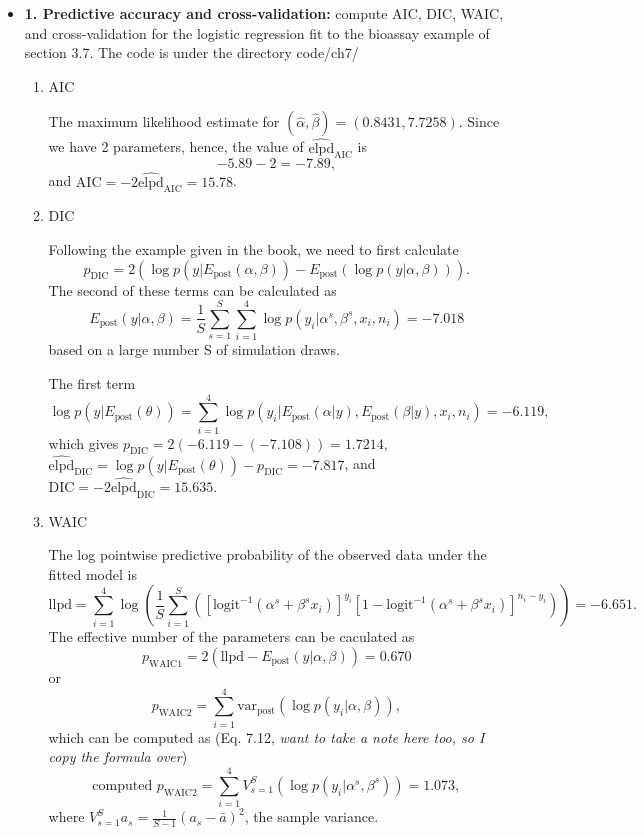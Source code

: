 \documentclass{article}
\begin{document}
\begin{itemize}

\item \textbf{1. Predictive accuracy and cross-validation: } compute AIC, DIC, WAIC, and cross-validation for the logistic regression fit to the bioassay example of section 3.7. The code is under the directory code/ch7/
  \begin{enumerate}
    \item AIC

      The maximum likelihood estimate for $(\hat{\alpha}, \hat{\beta}) = (0.8431, 7.7258)$. Since we have 2 parameters, hence, the value of $\hat{\text{elpd}}_{\text{AIC}}$ is
      $$
      -5.89 - 2 = -7.89,
      $$
      and $\text{AIC}=-2\hat{\text{elpd}}_{\text{AIC}} = 15.78$.
    
    \item DIC

      Following the example given in the book, we need to first calculate 
      $$p_{\text{DIC}} = 2 ( \log p(y|E_{\text{post}}(\alpha, \beta)) - E_{\text{post}} (\log p(y | \alpha, \beta))). $$
      The second of these terms can be calculated as
      $$
      E_{\text{post}}(y | \alpha, \beta) = \frac{1}{S} \sum_{s=1}^S \sum_{i=1}^4 \log p(y_i | \alpha^s, \beta^s, x_i, n_i) = -7.018
      $$
      based on a large number S of simulation draws. 
      
      The first term 
      $$
      \log p\left(y | E_{\text{post}} (\theta) \right) = \sum_{i=1}^4 \log p(y_i | E_{\text{post}}(\alpha|y), E_{\text{post}}(\beta | y), x_i, n_i) = -6.119,
      $$
      which gives $p_{\text{DIC}} = 2 (-6.119 - (-7.108)) = 1.7214$, $\hat{\text{elpd}}_{\text{DIC}} = \log p\left(y | E_{\text{post}} (\theta) \right) - p_{\text{DIC}} = -7.817$, and $\text{DIC} = -2 \hat{\text{elpd}}_{\text{DIC}} = 15.635$.

    \item WAIC

      The log pointwise predictive probability of the observed data under the fitted model is
      $$
      \text{llpd} = \sum_{i=1}^4 \log \left (\frac{1}{S} \sum_{i=1}^S \left([\text{logit}^{-1}(\alpha^s + \beta^s x_i)]^{y_i} [1 - \text{logit}^{-1}(\alpha^s + \beta^s x_i)]^{n_i - y_i} \right)\right) = -6.651.
      $$
      The effective number of the parameters can be caculated as 
      $$
      p_{\text{WAIC}1} = 2 (\text{llpd} - E_{\text{post}}(y | \alpha, \beta)) = 0.670
      $$
      or 
      $$
      p_{\text{WAIC}2} = \sum_{i=1}^4 \text{var}_{\text{post}} (\log p(y_i | \alpha, \beta)),
      $$
      which can be computed as (Eq. 7.12, \textit{want to take a note here too, so I copy the formula over}) 
      $$
      \text{computed }p_{\text{WAIC}2} = \sum_{i=1}^4 V_{s=1}^S \left( \log p(y_i|\alpha^s, \beta^s) \right) = 1.073,
      $$
      where $V_{s=1}^S a_s = \frac{1}{S-1} (a_s - \bar a)^2$, the sample variance. 
      

\end{enumerate}
\end{itemize}
\end{document}
